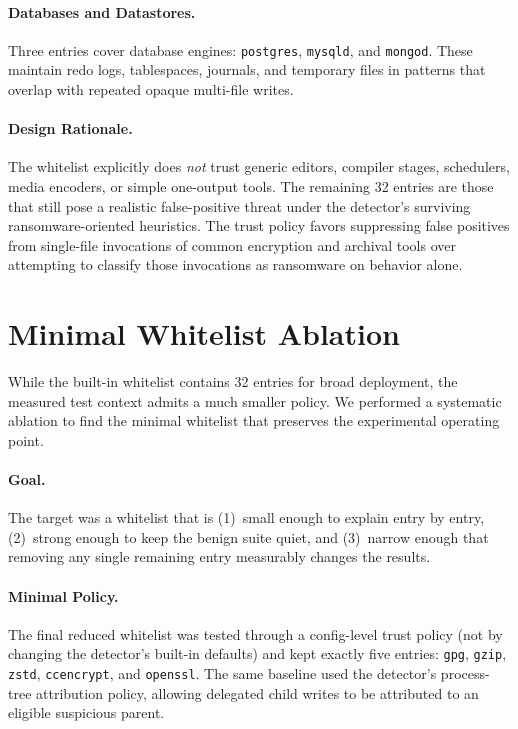 \documentclass[twocolumn, 10pt]{scrartcl}
\begin{document}
\paragraph{Databases and Datastores.}
Three entries cover database engines: \texttt{postgres}, \texttt{mysqld}, and
\texttt{mongod}. These maintain redo logs, tablespaces, journals, and temporary
files in patterns that overlap with repeated opaque multi-file writes.

\paragraph{Design Rationale.}
The whitelist explicitly does \emph{not} trust generic editors, compiler stages,
schedulers, media encoders, or simple one-output tools. The remaining 32 entries
are those that still pose a realistic false-positive threat under the detector's
surviving ransomware-oriented heuristics. The trust policy favors suppressing
false positives from single-file invocations of common encryption and archival
tools over attempting to classify those invocations as ransomware on behavior
alone.

\section{Minimal Whitelist Ablation}
\label{app:whitelist-ablation}

While the built-in whitelist contains 32 entries for broad deployment, the
measured test context admits a much smaller policy. We performed a systematic
ablation to find the minimal whitelist that preserves the experimental operating
point.

\paragraph{Goal.}
The target was a whitelist that is (1)~small enough to explain entry by entry,
(2)~strong enough to keep the benign suite quiet, and (3)~narrow enough that
removing any single remaining entry measurably changes the results.

\paragraph{Minimal Policy.}
The final reduced whitelist was tested through a config-level trust policy
(not by changing the detector's built-in defaults) and kept exactly five entries:
\texttt{gpg}, \texttt{gzip}, \texttt{zstd}, \texttt{ccencrypt}, and
\texttt{openssl}. The same baseline used the detector's process-tree attribution
policy, allowing delegated child writes to be attributed to an eligible
suspicious parent.
\end{document}
